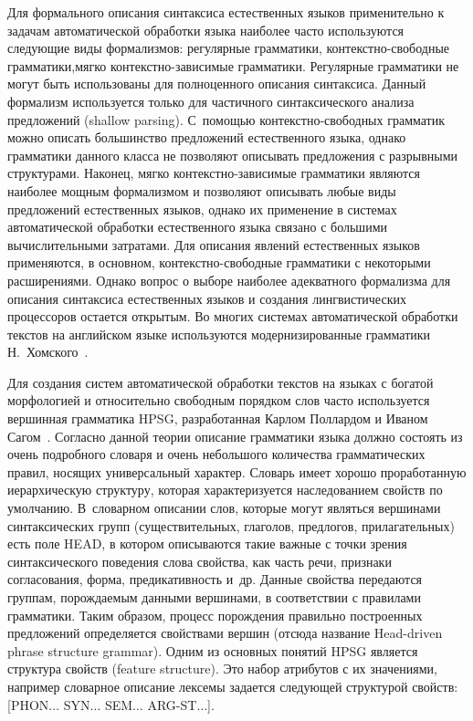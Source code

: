 \begin{multicols}{2}
     Для формального описания синтаксиса естест\-вен\-ных языков 
применительно к задачам автоматической обработки языка наиболее часто 
использу\-ются следующие виды формализмов: регулярные грамматики, 
     кон\-текст\-но-сво\-бод\-ные грамматики,\linebreak мягко 
     кон\-текст\-но-за\-ви\-си\-мые грамматики. Регулярные грамматики не 
могут быть использованы для полноценного описания синтаксиса. Данный\linebreak 
формализм используется только для частичного синтаксического анализа 
предложений (shallow parsing). С~помощью кон\-текст\-но-сво\-бод\-ных 
грамматик можно описать большинство предложений естественного языка, 
однако грамматики данного класса не позволяют описывать предложения с 
разрывными структурами. Наконец, мягко кон\-текст\-но-за\-ви\-си\-мые 
грамматики являются наиболее мощным формализмом и позволяют 
описывать любые виды предложений естественных языков, однако их 
применение в сис\-те\-мах автоматической обработки естественного языка 
связано с большими\linebreak
 вычислительными затратами. Для описания явлений 
естественных языков применяются, в основном, кон\-текст\-но-сво\-бод\-ные 
грамматики с некоторыми расширениями. Однако вопрос о выборе наиболее 
адекватного формализма для описания синтаксиса естественных языков и 
создания линг\-ви\-сти\-че\-ских процессоров остается открытым. Во многих 
сис\-те\-мах автоматической обработки текс\-тов на английском языке 
используются модернизированные грамматики Н.~Хомского~\cite{6-mor}. 
     
     Для создания сис\-тем автоматической обработки текстов на языках с 
богатой морфологией и относительно свободным порядком слов часто 
используется вершинная грамматика HPSG, разработанная Карлом Поллардом и Иваном Сагом~\cite{5-mor}. 
Согласно данной теории описание грамматики языка должно состоять из 
очень подробного словаря и очень небольшого количества грамматических 
правил, носящих универсальный характер. Словарь имеет хорошо 
проработанную иерархическую структуру, которая характеризуется 
наследованием свойств по умолчанию. В~словарном описании слов, которые 
могут являться вершинами синтаксических групп (существительных, 
глаголов, предлогов, прилагательных) есть поле HEAD, в котором 
описываются такие важные с точки зрения синтаксического поведения слова 
свойства, как часть речи, признаки согласования, форма, предикативность и~др. 
Данные свойства передаются группам, порождаемым данными 
вершинами, в соответствии с правилами грамматики. Таким образом, 
процесс порождения правильно построенных предложений определяется 
свойствами вершин (отсюда название Head-driven phrase structure grammar). 
Одним из основных понятий HPSG является структура свойств (feature 
structure). Это набор атрибутов с их значениями, например словарное 
описание лексемы задается следующей структурой свойств: [PHON$\ldots$ 
SYN$\ldots$ SEM$\ldots$ ARG-ST$\ldots$].
     

\end{multicols}
